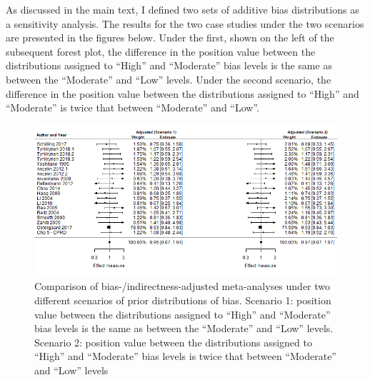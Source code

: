 \documentclass[a4paper, twoside]{templates/ociamthesis}
\begin{document}
As discussed in the main text, I defined two sets of additive bias distributions as a sensitivity analysis. The results for the two case studies under the two scenarios are presented in the figures below. Under the first, shown on the left of the subsequent forest plot, the difference in the position value between the distributions assigned to ``High'' and ``Moderate'' bias levels is the same as between the ``Moderate'' and ``Low'' levels. Under the second scenario, the difference in the position value between the distributions assigned to ``High'' and ``Moderate'' is twice that between ``Moderate'' and ``Low''.





\begin{figure}[H]
\includegraphics[width=1\linewidth]{figures/tri/fp_paired_midlife_ldl_ad_scenarios} \caption[Comparison of bias-/indirectness-adjusted meta-analyses of LDL-c/Alzheimer's disease, using two different scenarios for the relationship of levels of bias.]{Comparison of bias-/indirectness-adjusted meta-analyses under two different scenarios of prior distributions of bias. Scenario 1: position value between the distributions assigned to ``High'' and ``Moderate'' bias levels is the same as between the ``Moderate'' and ``Low'' levels. Scenario 2: position value between the distributions assigned to ``High'' and ``Moderate'' bias levels is twice that between ``Moderate'' and ``Low'' levels}\label{fig:fpLdlAdComparison}
\end{figure}
\end{document}
